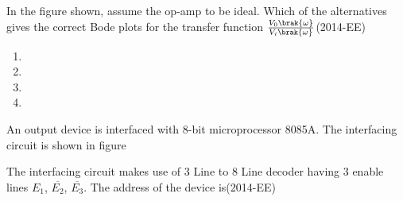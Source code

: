 \begin{center}

\end{center}

\begin{enumerate}
       \begin{multicols}{2} 
\item    


\item    

\item  

\item    
\end{multicols}  
\end{enumerate}



\item In the figure shown, assume the op-amp to be ideal. Which of the alternatives gives the correct Bode plots for the transfer function $\frac{V_0 \brak{\omega}}{V_i\brak{\omega}}$\hfill{(2014-EE)} 




\begin{enumerate}
   
\item    

\item    


\item  


\item    
\end{enumerate}
\item An output device is interfaced with 8-bit microprocessor 8085A. The interfacing circuit is shown in
figure 


\begin{center}

\end{center}


The interfacing circuit makes use of 3 Line to 8 Line decoder having 3 enable lines $E_1$, $\overline{E_2}$, $\overline{E_3}$. The
address of the device is\hfill{(2014-EE)} 

